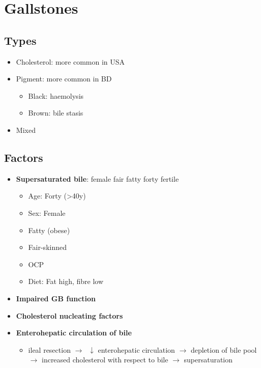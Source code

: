 \documentclass[
  14pt,
]{memoir}
\providecommand{\tightlist}{%
  \setlength{\itemsep}{0pt}\setlength{\parskip}{0pt}}
\begin{document}
\pagebreak

\hypertarget{gallstones}{%
\section{Gallstones}\label{gallstones}}

\hypertarget{types-3}{%
\subsection{Types}\label{types-3}}

\begin{itemize}
\tightlist
\item
  Cholesterol: more common in USA
\item
  Pigment: more common in BD

  \begin{itemize}
  \tightlist
  \item
    Black: haemolysis
  \item
    Brown: bile stasis
  \end{itemize}
\item
  Mixed
\end{itemize}

\hypertarget{factors-1}{%
\subsection{Factors}\label{factors-1}}

\begin{itemize}
\tightlist
\item
  \textbf{Supersaturated bile}: female fair fatty forty fertile

  \begin{itemize}
  \tightlist
  \item
    Age: Forty (\textgreater40y)
  \item
    Sex: Female
  \item
    Fatty (obese)
  \item
    Fair-skinned
  \item
    OCP
  \item
    Diet: Fat high, fibre low
  \end{itemize}
\item
  \textbf{Impaired GB function}
\item
  \textbf{Cholesterol nucleating factors}
\item
  \textbf{Enterohepatic circulation of bile}

  \begin{itemize}
  \tightlist
  \item
    ileal resection \(\rightarrow\; \;\downarrow\) enterohepatic
    circulation \(\rightarrow\) depletion of bile pool \(\rightarrow\)
    increased cholesterol with respect to bile \(\rightarrow\)
    supersaturation
  \end{itemize}
\end{itemize}
\end{document}
